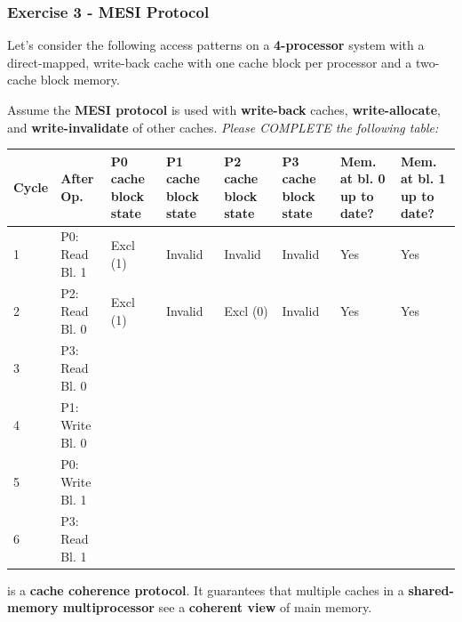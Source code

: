 \newpage

\subsubsection*{Exercise 3 - MESI Protocol}

Let's consider the following access patterns on a \textbf{4-processor} system with a direct-mapped, write-back cache with one cache block per processor and a two-cache block memory.

\highspace
Assume the \textbf{MESI protocol} is used with \textbf{write-back} caches, \textbf{write-allocate}, and \textbf{write-invalidate} of other caches. \emph{Please COMPLETE the following table:}

\begin{table}[!htp]
    \centering
    \begin{adjustbox}{width={\textwidth},totalheight={\textheight},keepaspectratio}
        \begin{tabular}{@{} l l p{4em} p{4em} p{4em} p{4em} p{3em} p{3em} @{}}
            \toprule
            \textbf{Cycle} & \textbf{After Op.} & \textbf{P0 cache block state} & \textbf{P1 cache block state} & \textbf{P2 cache block state} & \textbf{P3 cache block state} & \textbf{Mem. at bl. 0 up to date?} & \textbf{Mem. at bl. 1 up to date?} \\
            \midrule
            1   & P0: Read Bl. 1    & Excl (1)  & Invalid   & Invalid   & Invalid   & Yes   & Yes   \\ [.3em]
            2   & P2: Read Bl. 0    & Excl (1)  & Invalid   & Excl (0)  & Invalid   & Yes   & Yes   \\ [.3em]
            3   & P3: Read Bl. 0    &           &           &           &           &       &       \\ [.3em]
            4   & P1: Write Bl. 0   &           &           &           &           &       &       \\ [.3em]
            5   & P0: Write Bl. 1   &           &           &           &           &       &       \\ [.3em]
            6   & P3: Read Bl. 1    &           &           &           &           &       &       \\
            \bottomrule
        \end{tabular}
    \end{adjustbox}
\end{table}

\noindent
\answer {} is a \textbf{cache coherence protocol}. It guarantees that multiple caches in a \textbf{shared-memory multiprocessor} see a \textbf{coherent view} of main memory.

